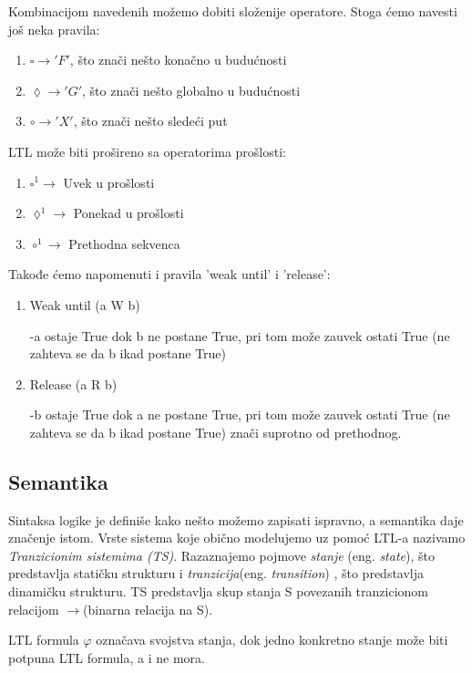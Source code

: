 \documentclass[a4paper]{article}
\begin{document}
{	Kombinacijom navedenih možemo dobiti složenije operatore. Stoga ćemo navesti još neka pravila:
\begin{enumerate}	
\item $\square \rightarrow 'F'$, što znači nešto konačno u budućnosti 
\item $\lozenge \rightarrow 'G'$, što znači nešto globalno u budućnosti 
\item $\circ \rightarrow 'X'$, što znači nešto sledeći put 
\end{enumerate}

	LTL može biti prošireno sa operatorima prošlosti: 
\begin{enumerate}	
\item $\square^1 \rightarrow $ Uvek u prošlosti  %
\item $\lozenge^1 \rightarrow $  Ponekad u prošlosti 
\item $\circ^1 \rightarrow $ Prethodna sekvenca 
\end{enumerate}

   Takođe ćemo napomenuti i pravila 'weak until' i 'release':
\begin{enumerate}	
\item  Weak until (a W b)

		-a ostaje True dok b ne postane True, pri tom može zauvek ostati True (ne zahteva se da b ikad postane True)
\item   Release (a R b) 

		-b ostaje True dok a ne postane True, pri tom može zauvek ostati True (ne zahteva se da b ikad postane True) znači suprotno od prethodnog.
\end{enumerate}		

	\subsection{Semantika}
	\label{subsec:podnaslovN}
	
	Sintaksa logike je definiše kako nešto možemo zapisati ispravno, a semantika daje značenje istom.
	Vrste sistema koje obično modelujemo uz pomoć LTL-a nazivamo \emph{Tranzicionim sistemima (TS)}. Razaznajemo pojmove \emph{stanje} (eng. \emph{state}), što predstavlja statičku strukturu i \emph{tranzicija}(eng. \emph{transition}) , što predstavlja dinamičku strukturu. TS predstavlja skup stanja S povezanih tranzicionom relacijom $\rightarrow $(binarna relacija na S).\cite{reeves1990logic}
	
	LTL formula $\varphi$ označava svojstva stanja, dok jedno konkretno stanje može biti potpuna LTL formula, a i ne mora.
	
}
\end{document}
